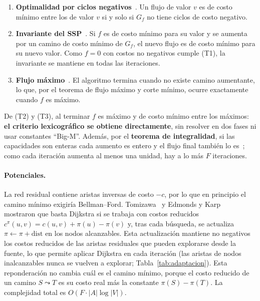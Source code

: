 \documentclass{article}
\begin{document}
\begin{enumerate}
    \item[(T1)] \textbf{Optimalidad por ciclos negativos}~\cite{klein1967}. Un flujo de valor $v$ es de costo mínimo entre los de valor $v$ si y solo si $G_f$ no tiene ciclos de costo negativo.
    \item[(T2)] \textbf{Invariante del SSP}~\cite{busacker1960}. Si $f$ es de costo mínimo para su valor y se aumenta por un camino de costo mínimo de $G_f$, el nuevo flujo es de costo mínimo para su nuevo valor. Como $f = 0$ con costos no negativos cumple (T1), la invariante se mantiene en todas las iteraciones.
    \item[(T3)] \textbf{Flujo máximo}~\cite{fordfulkerson1956}. El algoritmo termina cuando no existe camino aumentante, lo que, por el teorema de flujo máximo y corte mínimo, ocurre exactamente cuando $f$ es máximo.
\end{enumerate}

De (T2) y (T3), al terminar $f$ es máximo y de costo mínimo entre los máximos: \textbf{el criterio lexicográfico se obtiene directamente}, sin resolver en dos fases ni usar constantes ``Big-M''. Además, por el \textbf{teorema de integralidad}, si las capacidades son enteras cada aumento es entero y el flujo final también lo es~\cite{ahuja1993}; como cada iteración aumenta al menos una unidad, hay a lo más $F$ iteraciones.

\paragraph{Potenciales.} La red residual contiene aristas inversas de costo $-c$, por lo que en principio el camino mínimo exigiría Bellman--Ford. Tomizawa~\cite{tomizawa1971} y Edmonds y Karp~\cite{edmonds1972} mostraron que basta Dijkstra si se trabaja con costos reducidos $c^\pi(u, v) = c(u, v) + \pi(u) - \pi(v)$ y, tras cada búsqueda, se actualiza $\pi \gets \pi + \text{dist}$ en los nodos alcanzables. Esta actualización mantiene no negativos los costos reducidos de las aristas residuales que pueden explorarse desde la fuente, lo que permite aplicar Dijkstra en cada iteración (las aristas de nodos inalcanzables nunca se vuelven a explorar; Tabla~\ref{tab:adaptacion}). Esta reponderación no cambia cuál es el camino mínimo, porque el costo reducido de un camino $S \leadsto T$ es su costo real más la constante $\pi(S) - \pi(T)$. La complejidad total es $O(F \cdot |A| \log |V|)$.
\end{document}
